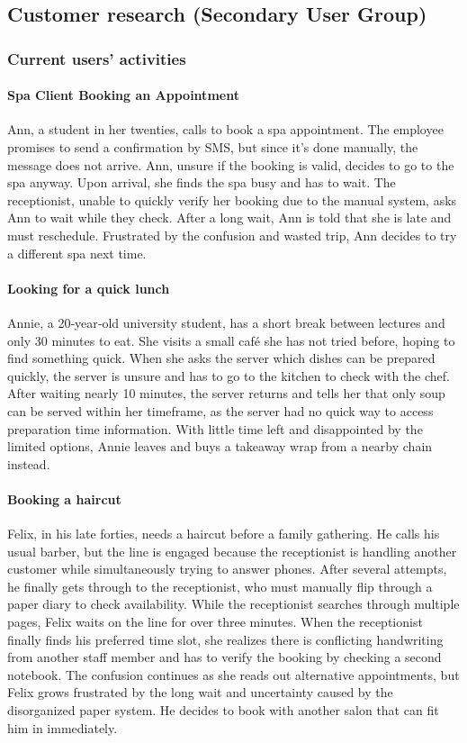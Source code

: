 \documentclass[]{VUMIFTemplateClass}
\newcommand{\subsubsubsection}[1]{\paragraph{#1}}
\begin{document}
\subsection{Customer research (Secondary User Group)}
\subsubsection{Current users' activities}

\subsubsubsection{Spa Client Booking an Appointment}
Ann, a student in her twenties, calls to book a spa appointment. The employee
promises to send a confirmation by SMS, but since it’s done manually, the
message does not arrive. Ann, unsure if the booking is valid, decides to go to
the spa anyway. Upon arrival, she finds the spa busy and has to wait. The
receptionist, unable to quickly verify her booking due to the manual system,
asks Ann to wait while they check. After a long wait, Ann is told that she is
late and must reschedule. Frustrated by the confusion and wasted trip, Ann
decides to try a different spa next time.

\subsubsubsection{Looking for a quick lunch}

Annie, a 20‑year‑old university student, has a short break between lectures and
only 30 minutes to eat. She visits a small café she has not tried before, hoping
to find something quick. When she asks the server which dishes can be prepared
quickly, the server is unsure and has to go to the kitchen to check with the
chef. After waiting nearly 10 minutes, the server returns and tells her that
only soup can be served within her timeframe, as the server had no quick way to
access preparation time information. With little time left and disappointed by
the limited options, Annie leaves and buys a takeaway wrap from a nearby chain
instead.

\newpage

\subsubsubsection{Booking a haircut}


Felix, in his late forties, needs a haircut before a family gathering. He calls
his usual barber, but the line is engaged because the receptionist is handling
another customer while simultaneously trying to answer phones. After several
attempts, he finally gets through to the receptionist, who must manually flip
through a paper diary to check availability. While the receptionist searches
through multiple pages, Felix waits on the line for over three minutes. When
the receptionist finally finds his preferred time slot, she realizes there is
conflicting handwriting from another staff member and has to verify the booking
by checking a second notebook. The confusion continues as she reads out
alternative appointments, but Felix grows frustrated by the long wait and
uncertainty caused by the disorganized paper system. He decides to book with
another salon that can fit him in immediately.
\end{document}
